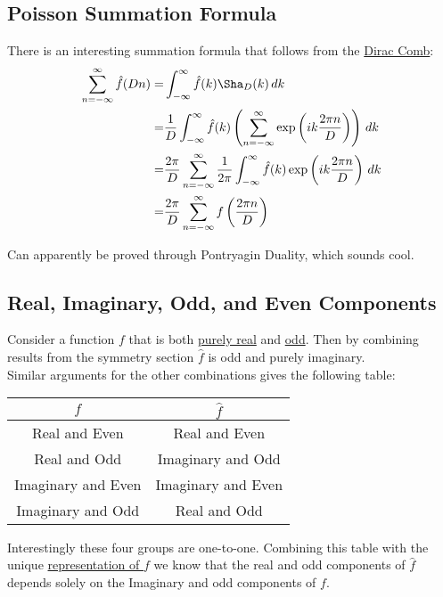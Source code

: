 \subsection{Poisson Summation Formula}
There is an interesting summation formula that follows from the \hyperref[appx:dirac-comb]{Dirac Comb}:
\begin{equation*}
\begin{aligned}
	\sum_{n=-\infty}^{\infty}\hat{f}(Dn) = & \int_{-\infty}^{\infty}\hat{f}(k)\Sha_D(k)\,dk \\
	= &\frac{1}{D} \int_{-\infty}^{\infty}\hat{f}(k)\left(\sum_{n=-\infty}^{\infty}\exp\left(ik \frac{2\pi n}{D}\right)\right)\,dk\\
	= &\frac{2\pi}{D} \sum_{n=-\infty}^{\infty}\frac{1}{2\pi}\int_{-\infty}^{\infty}\hat{f}(k)\exp\left(ik \frac{2\pi n}{D}\right)\,dk\\
	= &\frac{2\pi}{D} \sum_{n=-\infty}^{\infty}f\left(\frac{2\pi n}{D}\right)\\
\end{aligned}
\end{equation*}

Can apparently be proved through Pontryagin Duality, which sounds cool. 

\subsection{Real, Imaginary, Odd, and Even Components}
Consider a function $f$ that is both \hyperref[sec:conjugation-sym]{purely real} and \hyperref[sec:parity-sym]{odd}.
Then by combining results from the symmetry section $\hat{f}$ is odd and purely imaginary.
\\

Similar arguments for the other combinations gives the following table:

\begin{center}
\begin{tabular}{c|c}
	$f$ & $\hat{f}$ \\ \hline
	Real and Even & Real and Even \\
	Real and Odd & Imaginary and Odd \\
	Imaginary and Even & Imaginary and Even \\
	Imaginary and Odd & Real and Odd \\
\end{tabular}
\end{center}

Interestingly these four groups are one-to-one.
Combining this table with the unique \hyperref[appx:real-img-odd-even]{representation of $f$} we know that the real and odd components of $\hat{f}$ depends solely on the Imaginary and odd components of $f$.

